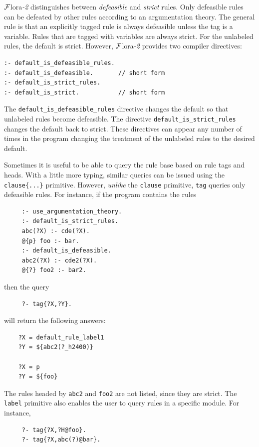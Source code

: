 \documentclass[11pt]{article}
\newcommand{\FLORA}{{\mbox{\sc ${\cal F}${lora}\rm\emph{-2}}}\xspace}
\begin{document}
\FLORA distinguishes between \emph{defeasible} and \emph{strict} rules.
Only defeasible rules can be defeated by other rules according to an
argumentation theory.
The general rule is that an explicitly tagged rule is always defeasible
unless the tag is a variable. Rules that are tagged with variables are
always strict.
For the unlabeled rules, the default is strict. However, \FLORA provides
two compiler directives:
\begin{verbatim}
:- default_is_defeasible_rules.
:- default_is_defeasible.       // short form
:- default_is_strict_rules.
:- default_is_strict.           // short form
\end{verbatim}
The \verb|default_is_defeasible_rules| directive changes the default so
that unlabeled rules become defeasible. The directive
\verb|default_is_strict_rules| changes the default back to strict.
These directives can appear any number of times in the program
changing the treatment of the unlabeled rules to the desired default.

Sometimes it is useful to be able to query the rule base based on rule
tags and heads. With a little more typing, similar queries can be issued
using the {\tt clause\{...\}} primitive. However, 
\emph{unlike} the {\tt clause} primitive, 
{\tt tag}  queries only defeasible rules. For instance, if the program
contains the rules
\begin{verbatim}
     :- use_argumentation_theory.
     :- default_is_strict_rules.
     abc(?X) :- cde(?X).
     @{p} foo :- bar.
     :- default_is_defeasible.
     abc2(?X) :- cde2(?X).
     @{?} foo2 :- bar2.
\end{verbatim}
then the query
\begin{verbatim}
     ?- tag{?X,?Y}.
\end{verbatim}
will return the following answers:
\begin{verbatim}
    ?X = default_rule_label1
    ?Y = ${abc2(?_h2400)}

    ?X = p
    ?Y = ${foo}
\end{verbatim}
The rules headed by {\tt abc2} and {\tt foo2} are not listed, since they
are strict.  
The {\tt label} primitive also enables the user to query rules in a specific
module. For instance,
\begin{verbatim}
     ?- tag{?X,?H@foo}.
     ?- tag{?X,abc(?)@bar}.
\end{verbatim}
\end{document}
